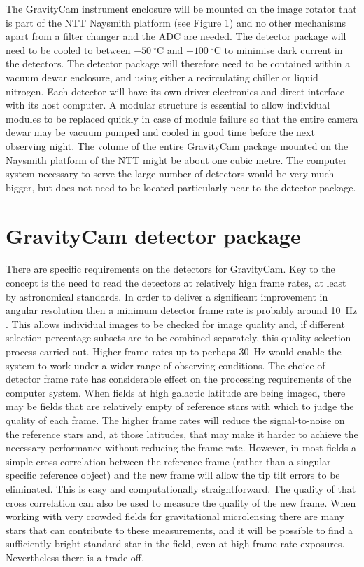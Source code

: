 \documentclass{pasa}%
\begin{document}
The \mbox{GravityCam} instrument enclosure will be mounted on the image rotator that is part of the NTT Naysmith platform (see Figure 1) and no other mechanisms apart from a filter changer and the ADC are needed. The detector package will need to be cooled to between $-50~^\circ{}$C and $-100~^\circ{}$C to minimise dark current in the detectors.  The detector package will therefore need to be contained within a vacuum dewar enclosure, and using either a recirculating chiller or liquid nitrogen.  Each detector will have its own driver electronics and direct interface with its host computer.  A modular structure is essential to allow individual modules to be replaced quickly in case of module failure so that the entire camera dewar may be vacuum pumped and cooled in good time before the next observing night.  The volume of the entire \mbox{GravityCam} package mounted on the Naysmith platform of the NTT might be about one cubic metre.  The computer system necessary to serve the large number of detectors would be very much bigger, but does not need to be located particularly near to the detector package.

\section{GravityCam detector package}

There are specific requirements on the detectors for \mbox{GravityCam}.  Key to the concept is the need to read the detectors at relatively high frame rates, at least by astronomical standards.  In order to deliver a significant improvement in angular resolution then a minimum detector frame rate is probably around 10~Hz \citep{Baldwin+2001}.  This allows individual images to be checked for image quality and, if different selection percentage subsets are to be combined separately, this quality selection process carried out. Higher frame rates up to perhaps 30~Hz would enable the system to work under a wider range of observing conditions.  The choice of detector frame rate has considerable effect on the processing requirements of the computer system. When fields at high galactic latitude are being imaged, there may be fields that are relatively empty of reference stars with which to judge the quality of each frame.  The higher frame rates will reduce the signal-to-noise on the reference stars and, at those latitudes, that may make it harder to achieve the necessary performance without reducing the frame rate.  However, in most fields a simple cross correlation between the reference frame (rather than a singular specific reference object) and the new frame will allow the tip tilt errors to be eliminated. This is easy and
computationally straightforward. The quality of that cross correlation can also be used to measure the quality of the new frame.
When working with very crowded fields for gravitational microlensing there are many stars that can contribute to these measurements, and it will be possible to find a sufficiently bright standard star in the field, even at high frame rate exposures.  Nevertheless there is a trade-off. 
\end{document}
